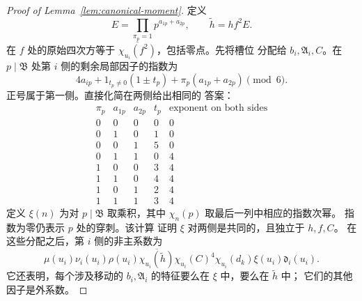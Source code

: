 \documentclass[11pt,a4paper]{article}
\numberwithin{equation}{section}
\numberwithin{figure}{section}
\theoremstyle{definition}
\theoremstyle{remark}
\begin{document}
\begin{proof}[Proof of Lemma~\ref{lem:canonical-moment}]
定义
\[
 E=\prod_{\pi_p=1}p^{a_{1p}+a_{2p}},\qquad
 \widetilde h=hf^2E.
\]
在 \(f\) 处的原始四次方等于
\(\overline{\chi_{u_i}(f^2)}\)，包括零点。先将槽位
分配给 \(b_i,\mathfrak A_i,C\)。在 \(p\mid\mathfrak B\) 处第 \(i\) 侧的剩余局部因子的指数为
\[
 4a_{ip}+1_{t_p\ne0}(1\mathbin{\pm}t_p)
          +\pi_p(a_{1p}+a_{2p})\pmod6.
\]
正号属于第一侧。直接化简在两侧给出相同的
答案：
\[
 \begin{array}{c|cc|c|c}
 \pi_p&a_{1p}&a_{2p}&t_p&\text{exponent on both sides}\\ \hline
 0&0&0&0&0\\
 0&1&0&1&0\\
 0&0&1&5&0\\
 0&1&1&0&4\\
 1&0&0&3&4\\
 1&1&0&4&4\\
 1&0&1&2&4\\
 1&1&1&3&4
 \end{array}
\]
定义 \(\xi(n)\) 为对 \(p\mid\mathfrak B\) 取乘积，其中
\(\chi_n(p)\) 取最后一列中相应的指数次幂。
指数为零仍表示 \(p\) 处的穿刺。该计算
证明 \(\xi\) 对两侧是共同的，且独立于 \(h,f,C\)。
在这些分配之后，第 \(i\) 侧的非主系数为
\begin{equation}\tag{C}\label{eq:first-poisson-column}
 \mu(u_i)\nu_i(u_i)\rho(u_i)
 \overline{\chi_{u_i}(\widetilde h)}
 \chi_{u_i}(C)^4\chi_{u_i}(d_k)\xi(u_i)\mathfrak d_i(u_i).
\end{equation}
它还表明，每个涉及移动的
\(b_i,\mathfrak A_i\) 的特征要么在 \(\xi\) 中，要么在 \(\widetilde h\) 中；
它们的其他因子是外系数。


\end{proof}
\end{document}
